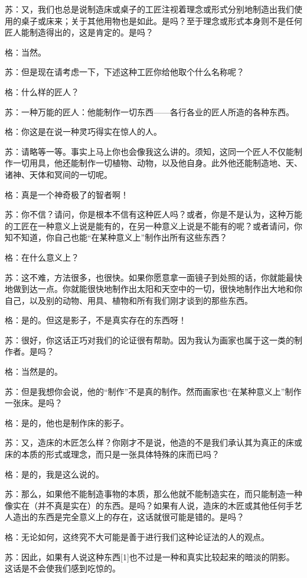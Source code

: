 \documentclass[12pt,oneside]{book}
\begin{document}
苏：又，我们也总是说制造床或桌子的工匠注视着理念或形式分别地制造出我们使用的桌子或床来；关于其他用物也是如此。是吗？至于理念或形式本身则不是任何匠人能制造得出的，这是肯定的。是吗？

格：当然。

苏：但是现在请考虑一下，下述这种工匠你给他取个什么名称呢？

格：什么样的匠人？

苏：一种万能的匠人：他能制作一切东西——各行各业的匠人所造的各种东西。

格：你这是在说一种灵巧得实在惊人的人。

苏：请略等一等。事实上马上你也会像我这么讲的。须知，这同一个匠人不仅能制作一切用具，他还能制作一切植物、动物，以及他自身。此外他还能制造地、天、诸神、天体和冥间的一切呢。

格：真是一个神奇极了的智者啊！

苏：你不信？请问，你是根本不信有这种匠人吗？或者，你是不是认为，这种万能的工匠在一种意义上说是能有的，在另一种意义上说是不能有的呢？或者请问，你知不知道，你自己也能“在某种意义上”制作出所有这些东西？

格：在什么意义上？

苏：这不难，方法很多，也很快。如果你愿意拿一面镜子到处照的话，你就能最快地做到达一点。你就能很快地制作出太阳和天空中的一切，很快地制作出大地和你自己，以及别的动物、用具、植物和所有我们刚才谈到的那些东西。

格：是的。但这是影子，不是真实存在的东西呀！

苏：很好，你这话正巧对我们的论证很有帮助。因为我认为画家也属于这一类的制作者。是吗？

格：当然是的。

苏：但是我想你会说，他的“制作”不是真的制作。然而画家也“在某种意义上”制作一张床。是吗？

格：是的，他也是制作床的影子。

苏：又，造床的木匠怎么样？你刚才不是说，他造的不是我们承认其为真正的床或床的本质的形式或理念，而只是一张具体特殊的床而已吗？

格：是的，我是这么说的。

苏：那么，如果他不能制造事物的本质，那么他就不能制造实在，而只能制造一种像实在（并不真是实在）的东西。是吗？如果有人说，造床的木匠或其他任何手艺人造出的东西是完全意义上的存在，这话就很可能是错的。是吗？

格：无论如何，这终究不大可能是善于进行我们这种论证法的人的观点。

苏：因此，如果有人说这种东西[1]也不过是一种和真实比较起来的暗淡的阴影。这话是不会使我们感到吃惊的。
\end{document}
